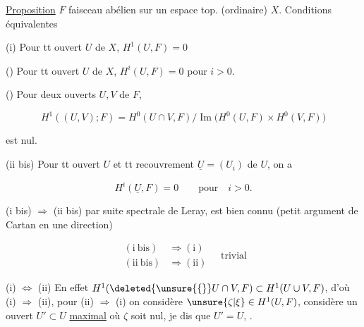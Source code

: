
\uline{Proposition} $F$ faisceau abélien sur un espace top. (ordinaire) $X$. Conditions équivalentes

(i) Pour tt ouvert $U$ de $X$, $H^1(U,F)=0$

() Pour tt ouvert $U$ de $X$, $H^i(U,F)=0$ pour $i>0$.

()  Pour deux ouverts $U,V$ de $F$,

\[
H^1((U,V);F)=H^0(U\cap V,F)/\operatorname{Im}\big(H^0(U,F)\times H^0(V,F)\big)
\]

est nul.

(ii bis) Pour tt ouvert $U$ et tt recouvrement  $\underline{U}=(U_i)$ de $U$, on a

\[
H^i(\underline{U},F)=0\qquad\text{pour}\quad i>0.
\]

(i bis) $\Longrightarrow$ (ii bis) par suite spectrale de Leray, est bien connu (petit argument de Cartan en une direction)

\[
\begin{aligned}
(\mathrm{i\ bis})&\Longrightarrow(\mathrm{i})\\[-2pt]
(\mathrm{ii\ bis})&\Longrightarrow(\mathrm{ii})
\end{aligned}
\quad\text{trivial}
\]

(i) $\Longleftrightarrow$ (ii) En effet $H^1(\deleted{\unsure{\{} }U\cap V,F)\subset H^1(U\cup V,F)$, d'où (i) $\Rightarrow$ (ii), pour (ii) $\Longrightarrow$ (i) on  considère $\unsure{\zeta|\xi}\in H^1(U,F)$,  considère un ouvert $U'\subset U$ \uline{maximal}  où $\zeta$ soit nul, je dis que $U'=U$, .
